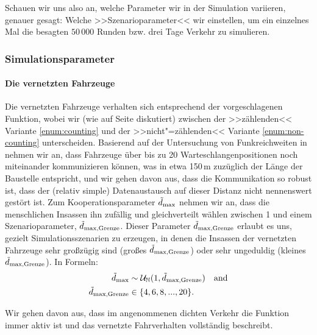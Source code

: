 Schauen wir uns also an, welche Parameter wir in der Simulation variieren, genauer gesagt: Welche >>Szenarioparameter<<  wir einstellen, um ein einzelnes Mal die besagten $50\,000$ Runden bzw. drei Tage Verkehr zu simulieren.




\subsubsection{Simulationsparameter}

\paragraph{Die vernetzten Fahrzeuge} Die vernetzten Fahrzeuge verhalten sich entsprechend der vorgeschlagenen Funktion, wobei wir (wie auf Seite \pageref{enum:counting} diskutiert) zwischen der >>zählenden<< Variante \ref{enum:counting} und der >>nicht"=zählenden<< Variante \ref{enum:non-counting} unterscheiden. Basierend auf der Untersuchung von Funkreichweiten in \cite{Kowalewski2020_1000099791} nehmen wir an, dass Fahrzeuge über bis zu 20 Warteschlangenpositionen noch miteinander kommunizieren können, was in etwa 150\,m zuzüglich der Länge der Baustelle entspricht, und wir gehen davon aus, dass die Kommunikation so robust ist, dass der (relativ simple) Datenaustausch auf dieser Distanz nicht nennenswert gestört ist. Zum Kooperationsparameter $\tilde{d}_{\text{max}}$ nehmen wir an, dass die menschlichen Insassen ihn zufällig und gleichverteilt wählen zwischen 1 und einem Szenarioparameter, $\tilde{d}_{\text{max,Grenze}}$. Dieser Parameter $\tilde{d}_{\text{max,Grenze}}$ erlaubt es uns, gezielt Simulationsszenarien zu erzeugen, in denen die Insassen der vernetzten Fahrzeuge sehr großzügig sind (großes $\tilde{d}_{\text{max,Grenze}}$) oder sehr ungeduldig (kleines $\tilde{d}_{\text{max,Grenze}}$). In Formeln:
\begin{equation}
\begin{aligned}
\tilde{d}_{\text{max}} &\sim \mathcal{U}_{\mathbb N}(1, \tilde{d}_{\text{max,Grenze}})\quad\text{and}\\
\tilde{d}_{\text{max,Grenze}} &\in \{4, 6, 8, ..., 20\}.
\end{aligned}
\end{equation}

Wir gehen davon aus, dass im angenommenen dichten Verkehr die Funktion immer aktiv ist und das vernetzte Fahrverhalten vollständig beschreibt.



